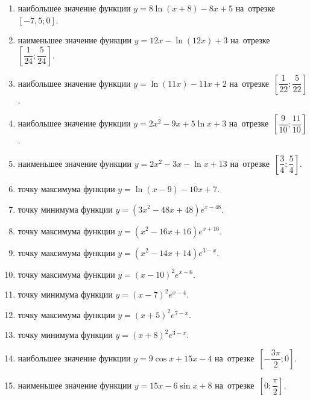 \documentclass[a4paper,10pt]{article}
\begin{document}
\begin{enumerate}
\item {} наибольшее значение функции $y=8\ln \left(x+8\right)-8x+5$ на~отрезке~$\left[-7,5;0\right]$.

\item {} наименьшее значение функции $y=12x-\ln \left(12x\right)+3$ на~отрезке~$\left[\dfrac{1}{24};\dfrac{5}{24}\right]$.

\item {} наибольшее значение функции $y=\ln \left(11x\right)-11x+2$ на~отрезке~$\left[\dfrac{1}{22};\dfrac{5}{22}\right]$.

\item {} наибольшее значение функции $y=2x^2-9x+5\ln x+3$ на~отрезке~$\left[\dfrac{9}{10};\dfrac{11}{10}\right]$.

\item {} наименьшее значение функции $y=2x^2-3x-\ln x+13$ на~отрезке~$\left[\dfrac{3}{4};\dfrac{5}{4}\right]$.

\item {} точку максимума функции $y=\ln \left(x-9\right)-10x+7$.

\item {} точку минимума функции $y=\left(3x^2-48x+48\right)e^{x-48}$.

\item {} точку максимума функции $y=\left(x^2-16x+16\right)e^{x+16}$.

\item {} точку максимума функции $y=\left(x^2-14x+14\right)e^{3-x}$.

\item {} точку максимума функции $y=\left(x-10\right)^2e^{x-6}$.

\item {} точку минимума функции $y=\left(x-7\right)^2e^{x-4}$.

\item {} точку максимума функции $y=\left(x+5\right)^2e^{7-x}$.

\item {} точку минимума функции $y=\left(x+8\right)^2e^{3-x}$.

\item {} наибольшее значение функции $y=9\cos x+15x-4$ на~отрезке~$\left[-\dfrac{3\pi }{2};0\right]$.

\item {} наименьшее значение функции $y=15x-6\sin x+8$ на~отрезке~$\left[0;\dfrac{\pi }{2}\right]$.


\end{enumerate}
\end{document}
